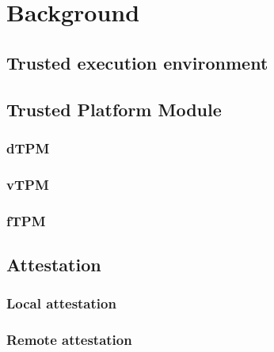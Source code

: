 \chapter{Background}\label{chapter:background}

\section{Trusted execution environment}

\section{Trusted Platform Module}
\subsection{dTPM}
\subsection{vTPM}
\subsection{fTPM}

\section{Attestation}
\subsection{Local attestation}
\subsection{Remote attestation}
